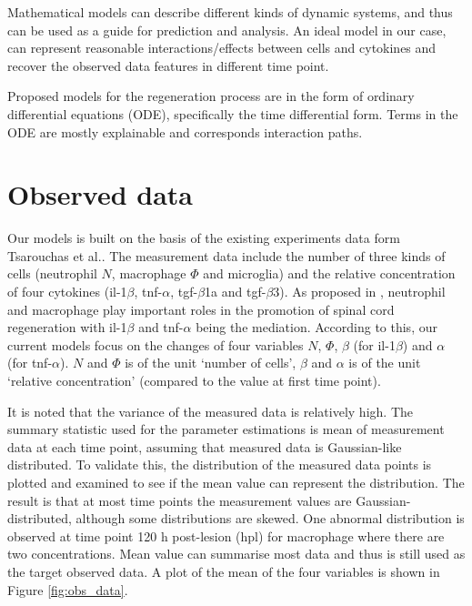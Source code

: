\documentclass[12pt,a4paper]{report}
\begin{document}
Mathematical models can describe different kinds of dynamic systems, and thus can be used as a guide for prediction and analysis. An ideal model in our case, can represent reasonable interactions/effects between cells and cytokines and recover the observed  data features in different time point. 

Proposed models for the regeneration process are in the form of ordinary differential equations (ODE), specifically the time differential form. Terms in the ODE are mostly explainable and corresponds interaction paths. 

\section{Observed data}

Our models is built on the basis of the existing experiments data form Tsarouchas et al.\cite{ref:Tsarouchas}. The measurement data include the number of three kinds of cells (neutrophil $N$, macrophage $\Phi$ and microglia) and the relative concentration of four cytokines (il-1$\beta$, tnf-$\alpha$, tgf-$\beta$1a and tgf-$\beta$3). As proposed in \cite{ref:Tsarouchas}, neutrophil and macrophage play important roles in the promotion of spinal cord regeneration with il-1$\beta$ and tnf-$\alpha$ being the mediation. According to this, our current models focus on the changes of four variables $N$, $\Phi $, $\beta$ (for il-1$\beta$) and $\alpha$ (for tnf-$\alpha$). $N$ and $\Phi$ is of the unit `number of cells', $\beta$ and $\alpha$ is of the unit `relative concentration' (compared to the value at first time point).

It is noted that the variance of the measured data is relatively high. The summary statistic used for the parameter estimations is mean of measurement data at each time point, assuming that measured data is Gaussian-like distributed. To validate this, the distribution of the measured data points is plotted and examined to see if the mean value can represent the distribution. The result is that at most time points the measurement values are Gaussian-distributed, although some distributions are skewed. One abnormal distribution is observed at time point 120 h post-lesion (hpl) for macrophage where there are two concentrations. Mean value can summarise most data and thus is still used as the target observed data. A plot of the mean of the four variables is shown in Figure \ref{fig:obs_data}.
\end{document}
